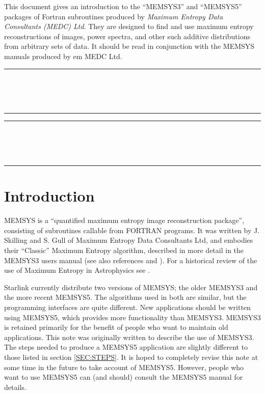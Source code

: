 This document gives an introduction to the ``MEMSYS3'' and ``MEMSYS5'' packages
of Fortran subroutines produced by {\em Maximum Entropy Data Consultants (MEDC)
Ltd}. They are designed to find and use maximum entropy reconstructions of
images, power spectra, and other such additive distributions from arbitrary sets
of data. It should be read in conjunction with the MEMSYS manuals produced by
{em MEDC Ltd}.

\newpage
\markright{\stardocname}
\null\vspace {5mm}
\begin {center}
\rule{80mm}{0.5mm} \\ [1ex]
{\Large\bf \stardoctitle \\ [2.5ex]
           \stardocversion} \\ [2ex]
\rule{80mm}{0.5mm}
\end{center}

\setlength{\parskip}{0mm}
\tableofcontents
\setlength{\parskip}{\medskipamount}

\newpage
\markright{\stardocname}
\renewcommand{\thepage}{\arabic{page}}
\setcounter{page}{1}

\null\vspace {5mm}
\begin {center}
\rule{80mm}{0.5mm} \\ [1ex]
{\Large\bf \stardoctitle \\ [2.5ex]
           \stardocversion} \\ [2ex]
\rule{80mm}{0.5mm}
\end{center}
\vspace{30mm}

\section {Introduction}
MEMSYS is a ``quantified maximum entropy image reconstruction
package'', consisting of subroutines callable from FORTRAN programs.
It was written by J. Skilling and S. Gull of Maximum Entropy Data
Consultants Ltd, and embodies their ``Classic'' Maximum Entropy
algorithm, described in more detail in the MEMSYS3 users manual (see
also references \cite{ref:Gull88} and \cite{ref:Skilling88}). For a historical
review of the use of Maximum Entropy in Astrophysics see \cite{ref:Narayan}.

Starlink currently distribute two versions of MEMSYS; the older MEMSYS3 and the
more recent MEMSYS5. The algorithms used in both are similar, but the
programming interfaces are quite different. New applications should be written
using MEMSYS5, which provides more functionality than MEMSYS3. MEMSYS3 is
retained primarily for the benefit of people who want to maintain old
applications. This note was originally written to describe the use of MEMSYS3.
The steps needed to produce a MEMSYS5 application are slightly different to
those listed in section \ref {SEC:STEPS}. It is hoped to completely revise this
note at some time in the future to take account of MEMSYS5. However, people
who want to use MEMSYS5 can (and should) consult the MEMSYS5 manual for
details.

